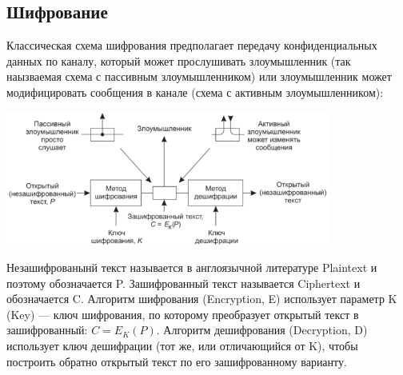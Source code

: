 \documentclass{../../text-style}
\begin{document}
\subsection{Шифрование}

Классическая схема шифрования предполагает передачу конфиденциальных данных по каналу, который может прослушивать злоумышленник (так наызваемая схема с пассивным злоумышленником) или злоумышленник может модифицировать сообщения в канале (схема с активным злоумышленником):

\begin{center}
    \includegraphics[width=0.8\textwidth]{cryptography.png}
\end{center}

Незашифрованынй текст называется в англоязычной литературе Plaintext и поэтому обозначается P. Зашифрованный текст называется Ciphertext и обозначается C. Алгоритм шифрования (Encryption, E) использует параметр K (Key) --- ключ шифрования, по которому преобразует открытый текст в зашифрованный: $C = E_K(P)$. Алгоритм дешифрования (Decryption, D) использует ключ дешифрации (тот же, или отличающийся от K), чтобы построить обратно открытый текст по его зашифрованному варианту.
\end{document}

